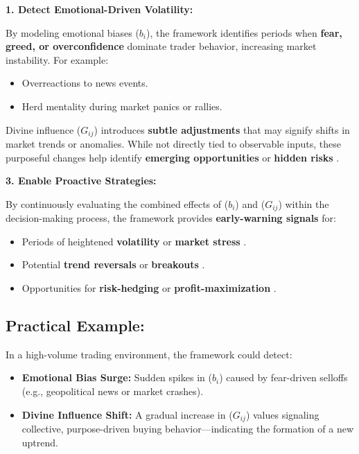\documentclass[a4]{article}
\newcommand{\no}{\noindent}
\newcommand{\bn}{\bigskip\noindent}
\begin{document}
\no
{\bf 1. Detect Emotional-Driven Volatility:}   

\medskip
   By modeling emotional biases ($b_i$), the framework identifies periods when {\bf fear, greed, or overconfidence}  dominate trader behavior, increasing market instability. For example:

\begin{itemize}
\item Overreactions to news events.
\item Herd mentality during market panics or rallies.
\end{itemize}
 
\bn
\bn {\bf 2. Signal Purposeful Shifts:}   

\medskip
   Divine influence ($G_{ij}$) introduces {\bf subtle adjustments}  that may signify shifts in market trends or anomalies. While not directly tied to observable inputs, these purposeful changes help identify {\bf emerging opportunities}  or {\bf hidden risks} .

\bn
 {\bf 3. Enable Proactive Strategies:}   
  
\medskip
   By continuously evaluating the combined effects of ($b_i$) and ($G_{ij}$) within the decision-making process, the framework provides {\bf early-warning signals}  for:

\begin{itemize}
\item  Periods of heightened {\bf volatility}  or {\bf market stress} .
\item Potential {\bf trend reversals}  or {\bf breakouts} .
\item Opportunities for {\bf risk-hedging}  or {\bf profit-maximization} .
\end{itemize}

\subsection*{Practical Example:}
In a high-volume trading environment, the framework could detect:

\begin{itemize}
\item {\bf Emotional Bias Surge:}  Sudden spikes in ($b_i$) caused by fear-driven selloffs (e.g., geopolitical news or market crashes).
\item {\bf Divine Influence Shift:}  A gradual increase in ($G_{ij}$) values signaling collective, purpose-driven buying behavior---indicating the formation of a new uptrend.
\end{itemize}
\end{document}
